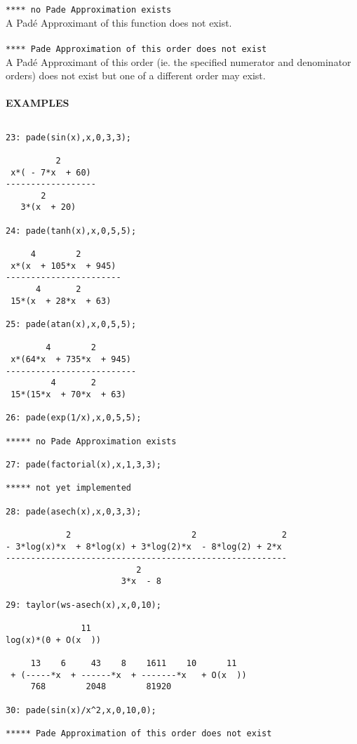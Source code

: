 {\tt ***** no Pade Approximation exists}\\

A Pad\'{e} Approximant of this function does not exist.\\ \\

\newpage
{\tt ***** Pade Approximation of this order does not exist}\\

A Pad\'{e} Approximant of this order (ie. the specified
numerator and denominator orders) does not exist but one
of a different order may exist.\\ \\


\large{{\bf EXAMPLES}}

\begin{verbatim}

23: pade(sin(x),x,0,3,3);

          2
 x*( - 7*x  + 60)
------------------
       2
   3*(x  + 20)

24: pade(tanh(x),x,0,5,5);

     4        2
 x*(x  + 105*x  + 945)
-----------------------
      4       2
 15*(x  + 28*x  + 63)

25: pade(atan(x),x,0,5,5);

        4        2
 x*(64*x  + 735*x  + 945)
--------------------------
         4       2
 15*(15*x  + 70*x  + 63)

26: pade(exp(1/x),x,0,5,5);

***** no Pade Approximation exists

27: pade(factorial(x),x,1,3,3);

***** not yet implemented

28: pade(asech(x),x,0,3,3);

            2                        2                 2
- 3*log(x)*x  + 8*log(x) + 3*log(2)*x  - 8*log(2) + 2*x
--------------------------------------------------------
                          2
                       3*x  - 8

29: taylor(ws-asech(x),x,0,10);

               11  
log(x)*(0 + O(x  ))

     13    6     43    8    1611    10      11
 + (-----*x  + ------*x  + -------*x   + O(x  ))
     768        2048        81920

30: pade(sin(x)/x^2,x,0,10,0);

***** Pade Approximation of this order does not exist


\end{verbatim}
